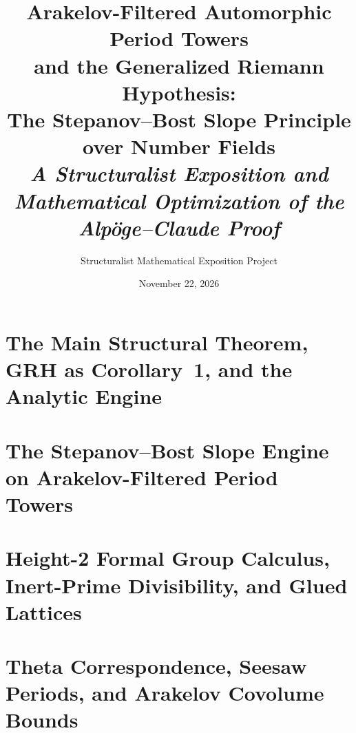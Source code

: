 

\title[Arakelov-Filtered Period Towers and the GRH]{%
  Arakelov-Filtered Automorphic Period Towers\\
  and the Generalized Riemann Hypothesis:\\[0.45em]
  \large The Stepanov--Bost Slope Principle over Number Fields\\
  \normalsize\normalfont\itshape A Structuralist Exposition and Mathematical Optimization of the Alp\"oge--Claude Proof}

\author{Structuralist Mathematical Exposition Project}
\date{November 22, 2026}



\frontmatter
\maketitle

\tableofcontents



\mainmatter

\part{The Main Structural Theorem, GRH as Corollary~1, and the Analytic Engine}





\part{The Stepanov--Bost Slope Engine on Arakelov-Filtered Period Towers}



\part{Height-2 Formal Group Calculus, Inert-Prime Divisibility, and Glued Lattices}





\part{Theta Correspondence, Seesaw Periods, and Arakelov Covolume Bounds}





